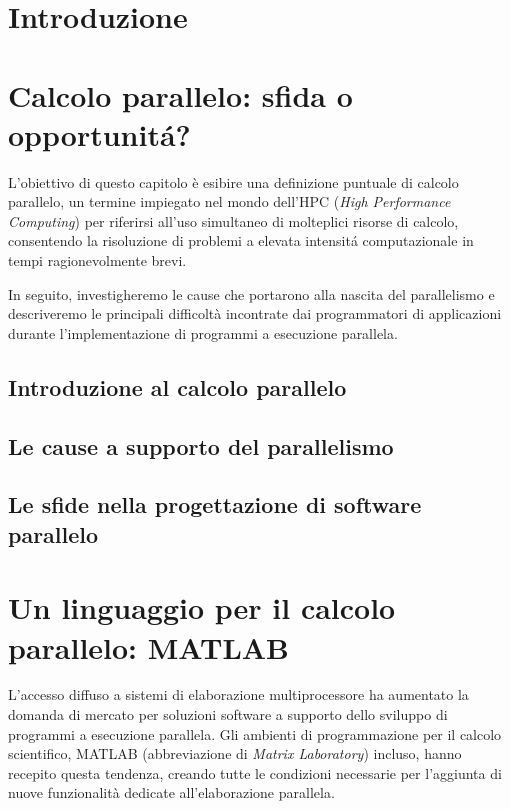 \documentclass[
	a4paper,
	twoside,
	12pt
]{book}
\theoremstyle{teorema}
\theoremstyle{stileEsempio}
\begin{document}
\frontmatter

\tableofcontents
\mainmatter
\chapter*{Introduzione}

\chapter{Calcolo parallelo: sfida o opportunit\'a?}
\label{cap1}
L'obiettivo di questo capitolo \`e esibire una definizione puntuale di calcolo parallelo, un termine impiegato nel mondo
dell'HPC (\textit{High Performance Computing}) per riferirsi all’uso simultaneo di molteplici risorse di calcolo, consentendo la risoluzione di problemi a
elevata intensit\'a computazionale in tempi ragionevolmente brevi.

In seguito, investigheremo le cause che portarono alla nascita del parallelismo e descriveremo le principali difficolt\`a incontrate dai programmatori di
applicazioni durante l'implementazione di programmi a esecuzione parallela.
\section{Introduzione al calcolo parallelo}
\label{par1.1}

\section{Le cause a supporto del parallelismo}
\label{par1.2}

\section{Le sfide nella progettazione di software parallelo}
\label{par1.3}

\chapter{Un linguaggio per il calcolo parallelo: MATLAB}
\label{cap2}
L'accesso diffuso a sistemi di elaborazione multiprocessore ha aumentato
la domanda di mercato per soluzioni software a supporto dello sviluppo di programmi a esecuzione parallela. \newline
Gli ambienti di programmazione per il calcolo scientifico, MATLAB (abbreviazione di \textit{Matrix Laboratory}) incluso, hanno recepito questa tendenza,
creando tutte le condizioni necessarie per l'aggiunta di nuove funzionalit\`a dedicate all'elaborazione parallela.
\end{document}

